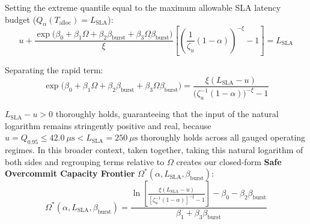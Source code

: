 \documentclass[pdflatex,sn-mathphys,Numbered]{sn-jnl}
\begin{document}
Setting the extreme quantile equal to the maximum allowable SLA latency budget ($Q_\alpha(T_{\text{alloc}}) = L_{\text{SLA}}$):
\begin{equation}
u + \frac{\exp\big(\beta_0 + \beta_1 \Omega + \beta_2 \beta_{\text{burst}} + \beta_3 \Omega \beta_{\text{burst}}\big)}{\xi} \left[\left(\frac{1}{\zeta_u}(1 - \alpha)\right)^{-\xi} - 1\right] = L_{\text{SLA}}
\label{eq:sla_equality}
\end{equation}

Separating the rapid term:
\begin{equation}
\exp\big(\beta_0 + \beta_1 \Omega + \beta_2 \beta_{\text{burst}} + \beta_3 \Omega \beta_{\text{burst}}\big) = \frac{\xi (L_{\text{SLA}} - u)}{\big(\zeta_u^{-1}(1 - \alpha)\big)^{-\xi} - 1}
\label{eq:exp_isolated}
\end{equation}

$L_{\text{SLA}} - u > 0$ thoroughly holds, guaranteeing that the input of the natural logarithm remains stringently positive and real, because $u = Q_{0.95} \le 42.0\ \mu\text{s} < L_{\text{SLA}} = 250\ \mu\text{s}$ thoroughly holds across all gauged operating regimes. In this broader context, taken together, taking this natural logarithm of both sides and regrouping terms relative to $\Omega$ creates our closed-form \textbf{Safe Overcommit Capacity Frontier} $\Omega^*(\alpha, L_{\text{SLA}}, \beta_{\text{burst}})$:
\begin{equation}
\Omega^*\left(\alpha, L_{\text{SLA}}, \beta_{\text{burst}}\right) = \frac{\ln\left[\frac{\xi \left(L_{\text{SLA}} - u\right)}{\left[\zeta_u^{-1}(1 - \alpha)\right]^{-\xi} - 1}\right] - \beta_0 - \beta_2 \beta_{\text{burst}}}{\beta_1 + \beta_3 \beta_{\text{burst}}}
\label{eq:omega_star_closed_form}
\end{equation}
\end{document}
